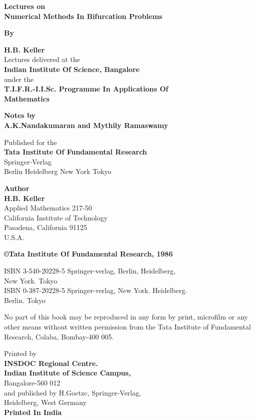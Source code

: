 \thispagestyle{empty}
\begin{center}
{\Large\bf  Lectures on}\\[5pt]
{\Large\bf Numerical Methods In Bifurcation Problems}\\
\vskip 1cm

{\bf By}
\medskip

{\large\bf H.B. Keller}\\[5pt]
{Lectures delivered at the}\\
{\bf Indian Institute Of Science, Bangalore}\\[5pt]
under the\\[5pt]
{\bf T.I.F.R.-I.I.Sc. Programme In Applications Of}\\[5pt]
{\bf  Mathematics}\\
\vfill

{\bf  Notes by}\\[5pt]
{\large\bf  A.K.Nandakumaran and Mythily Ramaswamy}\\
\vfill


Published for the\\
{\bf  Tata Institute Of Fundamental Research}\\
Springer-Verlag\\
Berlin Heidelberg New York Tokyo
\end{center}

\eject

\thispagestyle{empty}
\begin{center}
{\bf  Author}\\
{\large\bf H.B. Keller}\\
  Applied Mathematics 217-50\\
  California Institute of Technology\\
  Pasadena, California 91125\\
  U.S.A.
\vfill

\textbf{\copyright Tata Institute Of Fundamental Research, 1986}
 \vfill

  ISBN 3-540-20228-5 Springer-verlag, Berlin, Heidelberg,\\ New
  York. Tokyo\\
  ISBN 0-387-20228-5 Springer-verlag, New  York. Heidelberg.\\ 
  Berlin. Tokyo
\vfill


\parbox{0.7\textwidth}{No part of this book may be reproduced in 
any form by print, microfilm or any other means without 
written permission from the Tata Institute of 
Fundamental Research, Colaba, Bombay-400 005.}
\vfill


Printed by\\
{\bf INSDOC Regional Centre.}\\
{\bf Indian Institute of Science Campus,}\\
Bangalore-560 012\\
and published by H.Goctzc, Springer-Verlag, \\
Heidelberg, West Germany\\
{\bf Printed In India}
\end{center}

